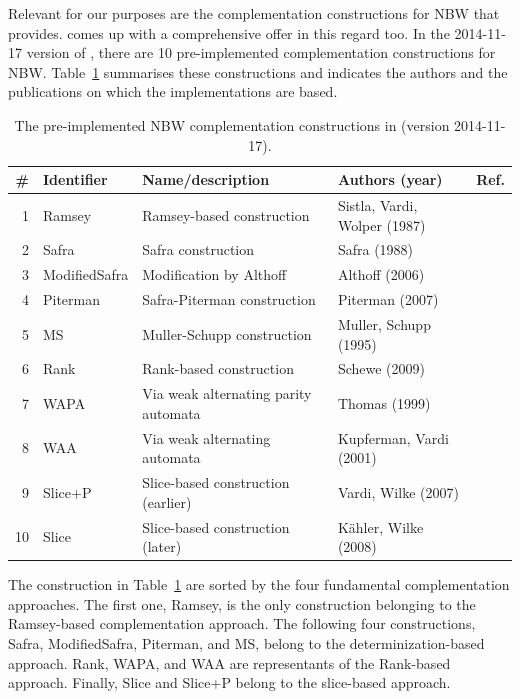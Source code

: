 Relevant for our purposes are the complementation constructions for NBW that \goal{} provides. \goal{} comes up with a comprehensive offer in this regard too. In the 2014-11-17 version of \goal{}, there are 10 pre-implemented complementation constructions for NBW. Table~\ref{goal_constructions} summarises these constructions and indicates the authors and the publications on which the implementations are based.

\begin{table}[htb!]
\centering
\begin{tabular}{rlllr}
\hline
\# & Identifier & Name/description & Authors (year) & Ref. \\
\hline
1 & Ramsey & Ramsey-based construction & Sistla, Vardi, Wolper (1987) & \cite{PrasadSistla1987217} \\
2 & Safra & Safra construction & Safra (1988) & \cite{1988_safra_1} \\
3 & ModifiedSafra & Modification by Althoff & Althoff (2006) & \cite{2006_althoff} \\
4 & Piterman & Safra-Piterman construction & Piterman (2007) & \cite{2007_piterman} \\
5 & MS & Muller-Schupp construction & Muller, Schupp (1995) & \cite{Muller199569} \\
6 & Rank & Rank-based construction & Schewe (2009) & \cite{schewe2009buchi} \\
7 & WAPA & Via weak alternating parity automata & Thomas (1999) & \cite{1999_thomas} \\
8 & WAA & Via weak alternating automata & Kupferman, Vardi (2001) & \cite{Kupferman:2001} \\
9 & Slice+P & Slice-based construction (earlier) & Vardi, Wilke (2007) & \cite{vardi2007automata} \\
10 & Slice & Slice-based construction (later) & Kähler, Wilke (2008) & \cite{2008_kaehler} \\
\hline
\end{tabular}
\caption{The pre-implemented NBW complementation constructions in \goal{} (version 2014-11-17).}
\label{goal_constructions}
\end{table}

The construction in Table~\ref{goal_constructions} are sorted by the four fundamental complementation approaches. The first one, Ramsey, is the only construction belonging to the Ramsey-based complementation approach. The following four constructions, Safra, ModifiedSafra, Piterman, and MS, belong to the determinization-based approach. Rank, WAPA, and WAA are representants of the Rank-based approach. Finally, Slice and Slice+P belong to the slice-based approach.


